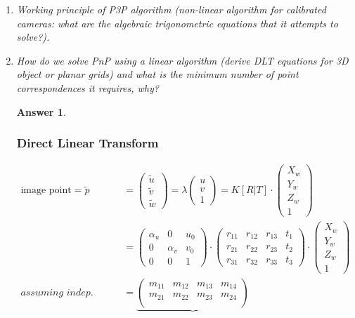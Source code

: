 \documentclass[a4paper,12 pt]{article}
\theoremstyle{definition}
\theoremstyle{remark}
\theoremstyle{definition}
\theoremstyle{definition}
\theoremstyle{definition}
\theoremstyle{definition}
\theoremstyle{remark}
\theoremstyle{remark}
\theoremstyle{definition}
\theoremstyle{definition}
\newtheorem*{answer}{Answer}
\begin{document}
\begin{enumerate}
\begin{enumerate}
\item \textit{Working principle of P3P algorithm (non-linear algorithm for calibrated cameras: what are the algebraic trigonometric equations that it attempts to solve?).}
\item \textit{How do we solve PnP using a linear algorithm (derive DLT equations for 3D object or planar grids) and what is the minimum number of point correspondences it requires, why?}
\begin{answer}
\subsubsection*{Direct Linear Transform}
\begin{equation}
\begin{split}
\text{image point}=\tilde{p}&=\begin{pmatrix}
\tilde{u}\\
\tilde{v}\\
\tilde{w}
\end{pmatrix} = \lambda \begin{pmatrix}
 u\\
 v\\
 1
 \end{pmatrix}=K[R|T]\cdot \begin{pmatrix}
 X_w\\
 Y_w\\
 Z_w\\
 1
 \end{pmatrix}\\
 &=\begin{pmatrix}
\alpha_u &0&u_0\\
0&\alpha_v &v_0\\
0&0&1
\end{pmatrix}\cdot \begin{pmatrix}
 r_{11}&r_{12}&r_{13}&t_1\\
 r_{21}&r_{22}&r_{23}&t_2\\
 r_{31}&r_{32}&r_{33}&t_3
 \end{pmatrix}\cdot \begin{pmatrix}
 X_w\\
 Y_w\\
 Z_w\\
 1
 \end{pmatrix}\\
\textit{assuming indep. elements} \qquad &=\underbrace{\begin{pmatrix}
 m_{11}&m_{12}&m_{13}&m_{14}\\
 m_{21}&m_{22}&m_{23}&m_{24}\\

\end{pmatrix}}
\end{split}
\end{equation}
\end{answer}
\end{enumerate}
\end{enumerate}
\end{document}
